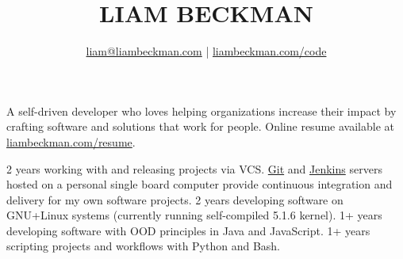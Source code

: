 


\title{\textcolor{my-red}{LIAM BECKMAN}}
\author{
    \textcolor{my-blue}{\href{mailto:liam@liambeckman.com}{liam@liambeckman.com}} | \textcolor{my-blue}{\href{https://liambeckman.com/code}{liambeckman.com/code}}
}

\date{\vspace{-5ex}}



\maketitle

\begin{center}
    A self-driven developer who loves helping organizations increase their impact by crafting software and solutions that work for people.
    Online resume available at \textcolor{my-blue}{\href{https://liambeckman.com/resume}{liambeckman.com/resume}}.
\end{center}





\vspace{-1em}
\begin{itemize}[label=$\triangleright$]
    2 years working with and releasing projects via VCS. \textcolor{my-blue}{\href{https://git.liambeckman.com/}{Git}} and \textcolor{my-blue}{\href{https://liambeckman.com/jenkins/blue/organizations/jenkins/pipelines/}{Jenkins}} servers hosted on a personal single board computer provide continuous integration and delivery for my own software projects.
    2 years developing software on GNU+Linux systems (currently running self-compiled 5.1.6 kernel).
    1+ years developing software with OOD principles in Java and JavaScript.
    1+ years scripting projects and workflows with Python and Bash.
\end{itemize}

\medbreak







\vfill


\pagebreak





